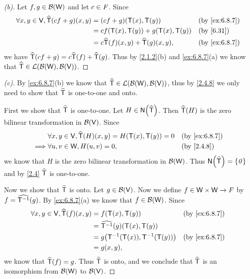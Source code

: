\begin{proof}[(b)]
  Let \(f, g \in \mathcal{B}(\mathsf{W})\) and let \(c \in \mathit{F}\).
  Since
  \begin{align*}
    \forall x, y \in \V, \widehat{\T}(cf + g)(x, y) & = (cf + g)(\T(x), \T(y))                           &  & \by{ex:6.8.7} \\
                                                    & = c f(\T(x), \T(y)) + g(\T(x), \T(y))              &  & \by{6.31}     \\
                                                    & = c \widehat{\T}(f)(x, y) + \widehat{\T}(g)(x, y), &  & \by{ex:6.8.7}
  \end{align*}
  we have \(\widehat{\mathsf{T}}(cf + g) = c \widehat{\mathsf{T}}(f) + \widehat{\mathsf{T}}(g)\).
  Thus by \cref{2.1.2}(b) and \cref{ex:6.8.7}(a) we know that \(\widehat{\mathsf{T}} \in \mathcal{L}(\mathcal{B}(\mathsf{W}), \mathcal{B}(\mathsf{V}))\).
\end{proof}

\begin{proof}[(c)]
  By \cref{ex:6.8.7}(b) we know that \(\widehat{\mathsf{T}} \in \mathcal{L}(\mathcal{B}(\mathsf{W}), \mathcal{B}(\mathsf{V}))\), thus by \cref{2.4.8} we only need to show that \(\widehat{\mathsf{T}}\) is one-to-one and onto.

  First we show that \(\widehat{\mathsf{T}}\) is one-to-one.
  Let \(H \in \ns{\widehat{\T}}\).
  Then \(\widehat{\mathsf{T}}(H)\) is the zero bilinear transformation in \(\mathcal{B}(\mathsf{V})\).
  Since
  \begin{align*}
             & \forall x, y \in \V, \widehat{\T}(H)(x, y) = H(\T(x), \T(y)) = 0 &  & \by{ex:6.8.7} \\
    \implies & \forall u, v \in \W, H(u, v) = 0,                                &  & \by{2.4.8}
  \end{align*}
  we know that \(H\) is the zero bilinear transformation in \(\mathcal{B}(\mathsf{W})\).
  Thus \(\ns{\widehat{\T}} = \set{\zv}\) and by \cref{2.4} \(\widehat{\mathsf{T}}\) is one-to-one.

  Now we show that \(\widehat{\mathsf{T}}\) is onto.
  Let \(g \in \mathcal{B}(\mathsf{V})\).
  Now we define \(f \in \mathsf{W} \times \mathsf{W} \to \mathit{F}\) by \(f = \widehat{\mathsf{T}^{-1}}(g)\).
  By \cref{ex:6.8.7}(a) we know that \(f \in \mathcal{B}(\mathsf{W})\).
  Since
  \begin{align*}
    \forall x, y \in \V, \widehat{\T}(f)(x, y) & = f\pa{\T(x), \T(y)}                   &  & \by{ex:6.8.7} \\
                                               & = \widehat{\T^{-1}}(g)(\T(x), \T(y))                      \\
                                               & = g\pa{\T^{-1}(\T(x)), \T^{-1}(\T(y))} &  & \by{ex:6.8.7} \\
                                               & = g(x, y),
  \end{align*}
  we know that \(\widehat{\mathsf{T}}(f) = g\).
  Thus \(\widehat{\mathsf{T}}\) is onto, and we conclude that \(\widehat{\mathsf{T}}\) is an isomorphism from \(\mathcal{B}(\mathsf{W})\) to \(\mathcal{B}(\mathsf{V})\).
\end{proof}

